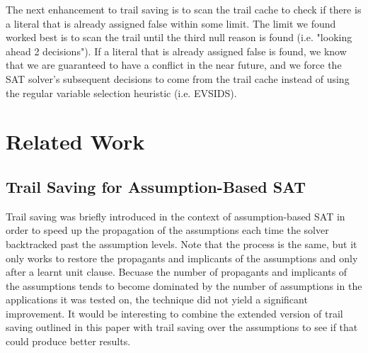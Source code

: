 \documentclass{article}
\begin{document}
The next enhancement to trail saving is to scan the trail cache to check if there is a literal that is already assigned false within some limit. The limit we found worked best is to scan the trail until the third null reason is found (i.e. "looking ahead 2 decisions"). If a literal that is already assigned false is found, we know that we are guaranteed to have a conflict in the near future, and we force the SAT solver's subsequent decisions to come from the trail cache instead of using the regular variable selection heuristic (i.e. EVSIDS).

\section{Related Work}
\subsection{Trail Saving for Assumption-Based SAT}
Trail saving was briefly introduced in the context of assumption-based SAT \cite{DBLP:conf/sat/HickeyB19} in order to speed up the propagation of the assumptions each time the solver backtracked past the assumption levels. Note that the process is the same, but it only works to restore the propagants and implicants of the assumptions and only after a learnt unit clause. Becuase the number of propagants and implicants of the assumptions tends to become dominated by the number of assumptions in the applications it was tested on, the technique did not yield a significant improvement. It would be interesting to combine the extended version of trail saving outlined in this paper with trail saving over the assumptions to see if that could produce better results. 
\end{document}
